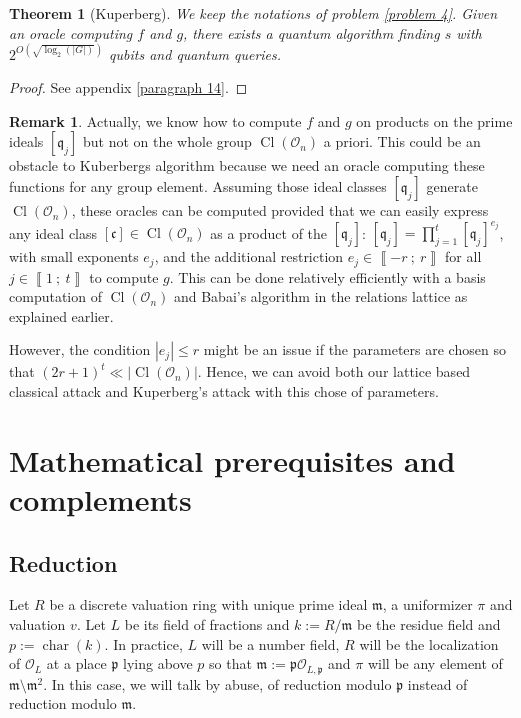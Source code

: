 \documentclass[a4paper,10pt]{report}
\theoremstyle{definition}
\theoremstyle{plain}
\newtheorem{theorem}[definition]{Theorem}
\theoremstyle{definition}
\newtheorem{remark}[definition]{Remark}
\newcommand{\mO}{\mathcal{O}}
\renewcommand{\i}[2]{\left\llbracket #1~;~#2\right\rrbracket}
\renewcommand{\(}{\left(}
\renewcommand{\)}{\right)}
\newcommand{\mf}[1]{\mathfrak{#1}}
\newcommand{\mfm}{\mathfrak{m}}
\newcommand{\mfp}{\mathfrak{p}}
\DeclareMathOperator{\Cl}{Cl}
\DeclareMathOperator{\Char}{char}%
\begin{document}
\begin{theorem}[Kuperberg]
We keep the notations of problem \ref{problem 4}. Given an oracle computing $f$ and $g$, there exists a quantum algorithm finding $s$ with $2^{O(\sqrt{\log_2(|G|)})}$ qubits and quantum queries.
\end{theorem}

\begin{proof}
See appendix \ref{paragraph 14}.
\end{proof}

\begin{remark}
Actually, we know how to compute $f$ and $g$ on products on the prime ideals $[\mf{q}_j]$ but not on the whole group $\Cl(\mO_n)$ a priori. This could be an obstacle to Kuberbergs algorithm because we need an oracle computing these functions for any group element. Assuming those ideal classes $[\mf{q}_j]$ generate $\Cl(\mO_n)$, these oracles can be computed provided that we can easily express any ideal class $[\mf{c}]\in \Cl(\mO_n)$ as a product of the $[\mf{q}_j]$: $[\mf{q}_j]=\prod_{j=1}^t[\mf{q}_j]^{e_j}$, with small exponents $e_j$, and the additional restriction $e_j\in\i{-r}{r}$ for all $j\in\i{1}{t}$ to compute $g$. This can be done relatively efficiently with a basis computation of $\Cl(\mO_n)$ and Babai's algorithm in the relations lattice as explained earlier.  

However, the condition $|e_j|\leq r$ might be an issue if the parameters are chosen so that $(2r+1)^t\ll |\Cl(\mO_n)|$. Hence, we can avoid both our lattice based classical attack and Kuperberg's attack with this chose of parameters.
\end{remark}






\appendix

\chapter{Mathematical prerequisites and complements}

\section{Reduction}

Let $R$ be a discrete valuation ring with unique prime ideal $\mf{m}$,  a uniformizer $\pi$ and valuation $v$.  Let $L$ be its field of fractions and $k:=R/\mfm$ be the residue field and $p:=\Char(k)$.  In practice,  $L$ will be a number field, $R$ will be the localization of $\mO_L$ at a place $\mfp$ lying above $p$ so that $\mfm:=\mfp\mO_{L,\mfp}$ and $\pi$ will be any element of $\mfm\setminus\mfm^2$.  In this case, we will talk by abuse, of reduction modulo $\mfp$ instead of reduction modulo $\mfm$. 
\end{document}
